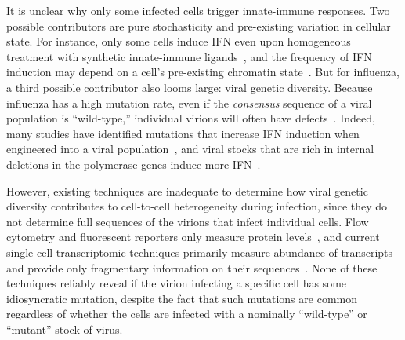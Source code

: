 \documentclass[9pt,lineno]{elife}
\begin{document}
It is unclear why only some infected cells trigger innate-immune responses.
Two possible contributors are pure stochasticity and pre-existing variation in cellular state.
For instance, only some cells induce IFN even upon homogeneous treatment with synthetic innate-immune ligands~\citep{shalek2013single, shalek2014single, wimmers2018single}, and the frequency of IFN induction may depend on a cell's pre-existing chromatin state~\citep{bhushal2017cell}.
But for influenza, a third possible contributor also looms large: viral genetic diversity.
Because influenza has a high mutation rate, even if the \emph{consensus} sequence of a viral population is ``wild-type,'' individual virions will often have defects~\citep{parvin1986measurement, suarez1992heterogeneity, suarez1994estimation, bloom2014experimentally, pauly2017novel}.
Indeed, many studies have identified mutations that increase IFN induction when engineered into a viral population~\citep{velthuis2018mini, du2018genome, killip2017single, perez2014unbiased}, and viral stocks that are rich in internal deletions in the polymerase genes induce more IFN~\citep{baum2010preference, tapia2013defective, boergeling2015evidence, dimmock2015cloned}.

However, existing techniques are inadequate to determine how viral genetic diversity contributes to cell-to-cell heterogeneity during infection, since they do not determine full sequences of the virions that infect individual cells.
Flow cytometry and fluorescent reporters only measure protein levels~\citep{brooke2013most, guo2017single}, and current single-cell transcriptomic techniques primarily measure abundance of transcripts and provide only fragmentary information on their sequences~\citep{russell2018extreme, zanini2018single, zanini2018virus, steuerman2018dissection, saikia2018simultaneous}.
None of these techniques reliably reveal if the virion infecting a specific cell has some idiosyncratic mutation, despite the fact that such mutations are common regardless of whether the cells are infected with a nominally ``wild-type'' or ``mutant'' stock of virus.
\end{document}
